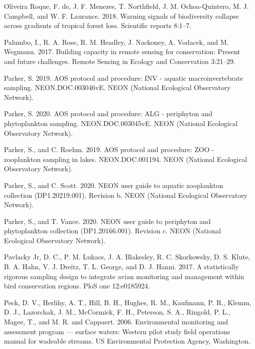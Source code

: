 \documentclass[
  12pt,
]{article}
\newlength{\cslhangindent}
\newlength{\cslentryspacingunit} %
\newenvironment{CSLReferences}[2] %
 {%
  \setlength{\parindent}{0pt}
  \ifodd #1
  \let\oldpar\par
  \def\par{\hangindent=\cslhangindent\oldpar}
  \fi
  \setlength{\parskip}{#2\cslentryspacingunit}
 }%
 {}
\begin{document}
\begin{CSLReferences}{1}{0}
\leavevmode{}%
Oliveira Roque, F. de, J. F. Menezes, T. Northfield, J. M. Ochoa-Quintero, M. J. Campbell, and W. F. Laurance. 2018. Warning signals of biodiversity collapse across gradients of tropical forest loss. Scientific reports 8:1--7.

\leavevmode{}%
Palumbo, I., R. A. Rose, R. M. Headley, J. Nackoney, A. Vodacek, and M. Wegmann. 2017. Building capacity in remote sensing for conservation: Present and future challenges. Remote Sensing in Ecology and Conservation 3:21--29.

\leavevmode{}%
Parker, S. 2019. AOS protocol and procedure: INV - aquatic macroinvertebrate sampling. NEON.DOC.003046vE. NEON (National Ecological Observatory Network).

\leavevmode{}%
Parker, S. 2020. AOS protocol and procedure: ALG - periphyton and phytoplankton sampling. NEON.DOC.003045vE. NEON (National Ecological Observatory Network).

\leavevmode{}%
Parker, S., and C. Roehm. 2019. AOS protocol and procedure: ZOO - zooplankton sampling in lakes. NEON.DOC.001194. NEON (National Ecological Observatory Network).

\leavevmode{}%
Parker, S., and C. Scott. 2020. NEON user guide to aquatic zooplankton collection (DP1.20219.001). Revision b. NEON (National Ecological Observatory Network).

\leavevmode{}%
Parker, S., and T. Vance. 2020. NEON user guide to periphyton and phytoplankton collection (DP1.20166.001). Revision c. NEON (National Ecological Observatory Network).

\leavevmode{}%
Pavlacky Jr, D. C., P. M. Lukacs, J. A. Blakesley, R. C. Skorkowsky, D. S. Klute, B. A. Hahn, V. J. Dreitz, T. L. George, and D. J. Hanni. 2017. A statistically rigorous sampling design to integrate avian monitoring and management within bird conservation regions. PloS one 12:e0185924.

\leavevmode{}%
Peck, D. V., Herlihy, A. T., Hill, B. H., Hughes, R. M., Kaufmann, P. R., Klemm, D. J., Lazorchak, J. M., McCormick, F. H., Peterson, S. A., Ringold, P. L., Magee, T., and M. R. and Cappaert. 2006. Environmental monitoring and assessment program --- surface waters: Western pilot study field operations manual for wadeable streams. US Environmental Protection Agency, Washington.


\end{CSLReferences}
\end{document}

